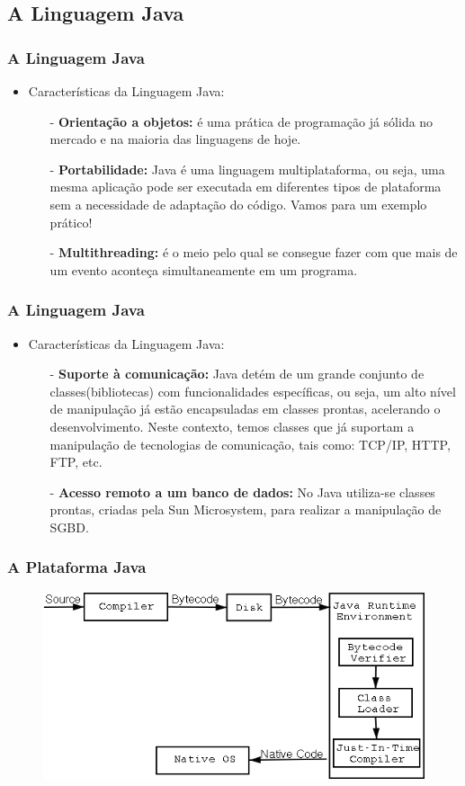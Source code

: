 \documentclass{beamer}
\begin{document}
\subsection{A Linguagem Java}

\begin{frame}
	\frametitle{A Linguagem Java}
	\begin{itemize}
		\item Características da Linguagem Java:
		\begin{itemize}
			\item[-] \textbf{Orientação a objetos:} é uma prática de programação já sólida no mercado e na maioria das linguagens de hoje.
			\item[-] \textbf{Portabilidade:} Java é uma linguagem multiplataforma, ou seja, uma mesma aplicação pode ser executada em diferentes tipos de plataforma sem a necessidade de adaptação do código. Vamos para um exemplo prático!
			\item[-] \textbf{Multithreading:} é o meio pelo qual se consegue fazer com que mais de um evento aconteça simultaneamente em um programa.
		\end{itemize}
	\end{itemize}
\end{frame}
\begin{frame}
	\frametitle{A Linguagem Java}
	\begin{itemize}
		\item Características da Linguagem Java:
		\begin{itemize}
			\item[-] \textbf{Suporte à comunicação:} Java detém de um grande conjunto de classes(bibliotecas) com funcionalidades específicas, ou seja, um alto nível de manipulação já estão encapsuladas em classes prontas, acelerando o desenvolvimento. Neste contexto, temos classes que já suportam a manipulação de tecnologias de comunicação, tais como: TCP/IP, HTTP, FTP, etc.
			\item[-] \textbf{Acesso remoto a um banco de dados:} No Java utiliza-se classes prontas, criadas pela Sun Microsystem, para realizar a manipulação de SGBD.
		\end{itemize}
	\end{itemize}
\end{frame}

\begin{frame}
	\frametitle{A Plataforma Java}
	\begin{figure}[h!]
		\centering
		\includegraphics[scale=0.55]{imagens/java-compilation}
	\end{figure}
\end{frame}
\end{document}
